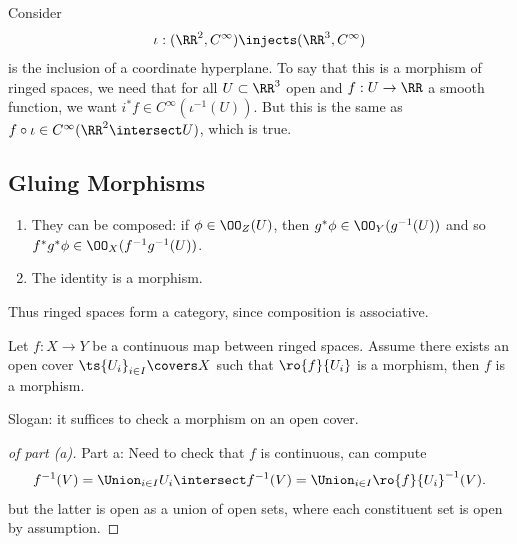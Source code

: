 \begin{example}

Consider
\begin{align*}
\iota: (\RR^2, C^\infty) \injects (\RR^3, C^\infty)
\end{align*} is the inclusion of a coordinate hyperplane. To say that
this is a morphism of ringed spaces, we need that for all
\(U\subset \RR^3\) open and \(f:U\to \RR\) a smooth function, we want
\(i^* f\in C^\infty (\iota^{-1}(U))\). But this is the same as
\(f\circ \iota \in C^\infty(\RR^2\intersect U)\), which is true.

\end{example}

\hypertarget{gluing-morphisms}{%
\subsection{Gluing Morphisms}\label{gluing-morphisms}}

\begin{proposition}

\envlist

\begin{enumerate}
\def\labelenumi{\arabic{enumi}.}
\item
  They can be composed: if \(\phi \in \OO_Z(U)\), then
  \(g^* \phi \in \OO_Y(g^{-1}(U))\) and so
  \(f^* g^* \phi \in \OO_X(f^{-1} g^{-1} (U))\).
\item
  The identity is a morphism.
\end{enumerate}

Thus ringed spaces form a category, since composition is associative.

\end{proposition}

\begin{lemma}

Let \(f:X\to Y\) be a continuous map between ringed spaces. Assume there
exists an open cover \(\ts{U_i}_{i\in I}\covers X\) such that
\(\ro{f}{U_i}\) is a morphism, then \(f\) is a morphism.

\end{lemma}

\begin{remark}

Slogan: it suffices to check a morphism on an open cover.

\end{remark}

\begin{proof}[of part (a)]

Part a: Need to check that \(f\) is continuous, can compute
\begin{align*}  
f^{-1}(V) = \Union_{i\in I} U_i \intersect f^{-1}(V) = \Union_{i\in I} \ro{f}{U_i}^{-1} (V)
.\end{align*} but the latter is open as a union of open sets, where each
constituent set is open by assumption.

\end{proof}

